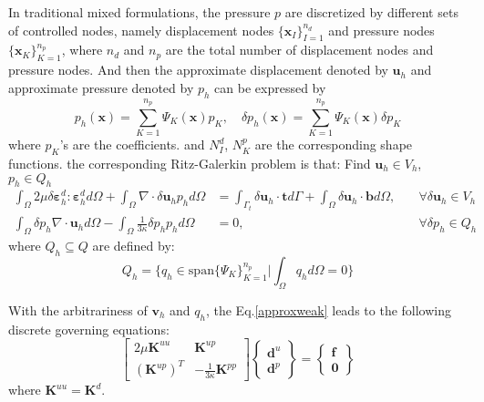 In traditional mixed formulations, the pressure $p$ are discretized by different sets of controlled nodes, namely displacement nodes $\{\boldsymbol x_I\}_{I=1}^{n_d}$ and pressure nodes $\{\boldsymbol x_K\}_{K=1}^{n_p}$, where $n_d$ and $n_p$ are the total number of displacement nodes and pressure nodes. And then the approximate displacement denoted by $\boldsymbol u_h$ and approximate pressure denoted by $p_h$ can be expressed by  
\begin{equation}\label{p_h}
    p_h(\boldsymbol x) = \sum_{K=1}^{n_p} \Psi_K(\boldsymbol x) p_K, \quad
    \delta p_h(\boldsymbol x) = \sum_{K=1}^{n_p} \Psi_K(\boldsymbol x) \delta p_K
\end{equation}
where $p_K$'s are the coefficients. and $N_I^d$, $N_K^p$ are the corresponding shape functions.
the corresponding Ritz-Galerkin problem is that:
Find $\boldsymbol u_h \in V_h$, $p_h \in Q_h$
\begin{subequations}\label{ritz_mix}
\begin{alignat}{2}
\label{ritz_mix_1}
\int_\Omega 2\mu \delta \boldsymbol \varepsilon^d_h : \boldsymbol \varepsilon^d_h d\Omega +
\int_\Omega \nabla \cdot \delta \boldsymbol u_h p_h d\Omega &=
\int_{\Gamma_t} \delta \boldsymbol u_h \cdot \boldsymbol t d\Gamma + \int_\Omega \delta \boldsymbol u_h \cdot \boldsymbol b d\Omega,  \quad
&\forall \delta \boldsymbol u_h \in V_h \\
\label{ritz_mix_2}
\int_\Omega \delta p_h \nabla \cdot \boldsymbol u_h d\Omega - \int_\Omega \frac{1}{3\kappa} \delta p_h p_h d\Omega &= 0, &\forall \delta p_h \in Q_h
\end{alignat}
\end{subequations}
where $Q_h \subseteq Q$ are defined by:
\begin{equation}
Q_h = \{q_h \in \mathrm{span}\{\Psi_K\}_{K=1}^{n_p} \vert \int_{\Omega} q_h d\Omega = 0\}
\end{equation}

With the arbitrariness of $\boldsymbol v_h$ and $q_h$, the Eq.\eqref{approxweak} leads to the following discrete governing equations:
\begin{equation}\label{equilibrium_mix}
    \begin{bmatrix}
        2\mu\boldsymbol K^{uu} & \boldsymbol K^{up} \\ (\boldsymbol K^{up})^T & -\frac{1}{3\kappa}\boldsymbol K^{pp}
    \end{bmatrix}
    \begin{Bmatrix}
        \boldsymbol d^u \\ \boldsymbol d^p 
    \end{Bmatrix} =
    \begin{Bmatrix}
        \boldsymbol f \\ \boldsymbol 0 
    \end{Bmatrix}
\end{equation}
where $\boldsymbol K^{uu} = \boldsymbol K^d$. 

